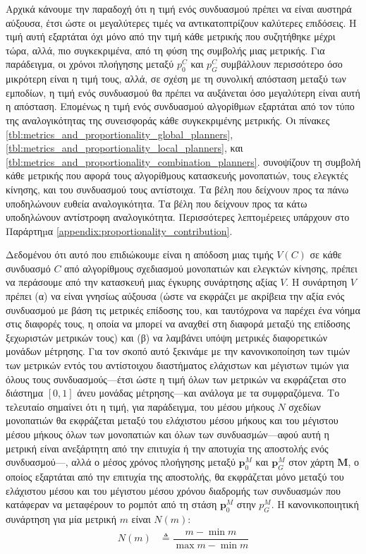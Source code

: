Αρχικά κάνουμε την παραδοχή ότι η τιμή ενός συνδυασμού πρέπει να είναι αυστηρά
αύξουσα, έτσι ώστε οι μεγαλύτερες τιμές να αντικατοπτρίζουν καλύτερες
επιδόσεις. Η τιμή αυτή εξαρτάται όχι μόνο από την τιμή κάθε μετρικής που
συζητήθηκε μέχρι τώρα, αλλά, πιο συγκεκριμένα, από τη φύση της συμβολής μιας
μετρικής. Για παράδειγμα, οι χρόνοι πλοήγησης μεταξύ $p_0^{C}$ και
$p_G^{C}$ συμβάλλουν περισσότερο όσο μικρότερη είναι η τιμή τους, αλλά,
σε σχέση με τη συνολική απόσταση μεταξύ των εμποδίων, η τιμή ενός συνδυασμού θα
πρέπει να αυξάνεται όσο μεγαλύτερη είναι αυτή η απόσταση. Επομένως η τιμή ενός
συνδυασμού αλγορίθμων εξαρτάται από τον τύπο της αναλογικότητας της συνεισφοράς
κάθε συγκεκριμένης μετρικής. Οι πίνακες
\ref{tbl:metrics_and_proportionality_global_planners},
\ref{tbl:metrics_and_proportionality_local_planners}, και
\ref{tbl:metrics_and_proportionality_combination_planners}.
συνοψίζουν τη συμβολή κάθε μετρικής που αφορά τους αλγορίθμους κατασκευής
μονοπατιών, τους ελεγκτές κίνησης, και του συνδυασμού τους αντίστοιχα. Τα βέλη
που δείχνουν προς τα πάνω υποδηλώνουν ευθεία αναλογικότητα. Τα βέλη που
δείχνουν προς τα κάτω υποδηλώνουν αντίστροφη αναλογικότητα. Περισσότερες
λεπτοµέρειες υπάρχουν στο Παράρτηµα
\ref{appendix:proportionality_contribution}.

Δεδομένου ότι αυτό που επιδιώκουμε είναι η απόδοση μιας τιμής $V(C)$ σε κάθε
συνδυασμό $C$ από αλγορίθμους σχεδιασμού μονοπατιών και ελεγκτών κίνησης,
πρέπει να περάσουμε από την κατασκευή μιας έγκυρης συνάρτησης αξίας $V$. Η
συνάρτηση $V$ πρέπει (α) να είναι γνησίως αύξουσα (ώστε να εκφράζει με ακρίβεια
την αξία ενός συνδυασμού με βάση τις μετρικές επίδοσης του, και ταυτόχρονα να
παρέχει ένα νόημα στις διαφορές τους, η οποία να μπορεί να αναχθεί στη διαφορά
μεταξύ της επίδοσης ξεχωριστών μετρικών τους) και (β) να λαμβάνει υπόψη
μετρικές διαφορετικών μονάδων μέτρησης. Για τον σκοπό αυτό ξεκινάμε με την
κανονικοποίηση των τιμών των μετρικών εντός του αντίστοιχου διαστήματος
ελάχιστων και μέγιστων τιμών για όλους τους συνδυασμούς---έτσι ώστε η τιμή όλων
των μετρικών να εκφράζεται στο διάστημα $[0,1]$ άνευ μονάδας μέτρησης---και
ανάλογα με τα συμφραζόμενα. Το τελευταίο σημαίνει ότι η τιμή, για παράδειγμα,
του μέσου μήκους $N$ σχεδίων μονοπατιών θα εκφράζεται μεταξύ του ελάχιστου
μέσου μήκους και του μέγιστου μέσου μήκους όλων των μονοπατιών και όλων των
συνδυασμών---αφού αυτή η μετρική είναι ανεξάρτητη από την επιτυχία ή την
αποτυχία της αποστολής ενός συνδυασμού---, αλλά ο μέσος χρόνος πλοήγησης μεταξύ
$\bm{p}_0^M$ και $\bm{p}_G^M$ στον χάρτη $\bm{M}$, ο οποίος εξαρτάται από την
επιτυχία της αποστολής, θα εκφράζεται μόνο μεταξύ του ελάχιστου μέσου και του
μέγιστου μέσου χρόνου διαδρομής των συνδυασμών που κατάφεραν να μεταφέρουν το
ρομπότ από τη στάση $\bm{p}_0^M$ στην ${p}_G^M$. Η κανονικοποιητική συνάρτηση
για μία μετρική $m$ είναι $N(m)$:
\begin{align}
  N(m) &\triangleq \dfrac{m - \min m}{\max m - \min m}
\end{align}

